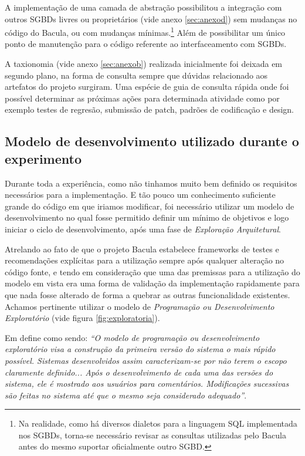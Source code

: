 A implementação de uma camada de abstração possibilitou a integração com outros SGBDs livres ou proprietários (vide anexo \ref{sec:anexod}) sem mudanças no código do Bacula, ou com mudanças mínimas.\footnote{Na realidade, como há diversos dialetos para a linguagem SQL implementada nos SGBDs, torna-se necessário revisar as consultas utilizadas pelo Bacula antes do mesmo suportar oficialmente outro SGBD.} Além de possibilitar um único ponto de manutenção para o código referente ao interfaceamento com SGBDs.

A taxionomia (vide anexo \ref{sec:anexob}) realizada inicialmente foi deixada em segundo plano, na forma de consulta sempre que dúvidas relacionado aos artefatos do projeto surgiram. Uma espécie de guia de consulta rápida onde foi possível determinar as próximas ações para determinada atividade como por exemplo testes de regresão, submissão de patch, padrões de codificação e design.

\subsection{Modelo de desenvolvimento utilizado durante o experimento} 

Durante toda a experiência, como não tinhamos muito bem definido os requisitos necessários para a implementação. E tão pouco um conhecimento suficiente grande do código em que iriamos modificar, foi necessário utilizar um modelo de desenvolvimento no qual fosse permitido definir um mínimo de objetivos e logo iniciar o ciclo de desenvolvimento, após uma fase de \textit{Exploração Arquitetural}. 

Atrelando ao fato de que o projeto Bacula estabelece frameworks de testes e recomendações explícitas para a utilização sempre após qualquer alteração no código fonte, e tendo em consideração que uma das premissas para a utilização do modelo em vista era uma forma de validação da implementação rapidamente para que nada fosse alterado de forma a quebrar as outras funcionalidade existentes. Achamos pertinente utilizar o modelo de \textit{Programação ou Desenvolvimento Exploratório} (vide figura \ref{fig:exploratoria}). 

Em \cite[página 31]{engenharia1} define como sendo: \textit{``O modelo de programação ou desenvolvimento exploratório visa a construção da primeira versão do sistema o mais rápido possível. Sistemas desenvolvidos assim caracterizam-se por não terem o escopo claramente definido... Após o desenvolvimento de cada uma das versões do sistema, ele é mostrado aos usuários para comentários. Modificações sucessivas são feitas no sistema até que o mesmo seja considerado adequado''}.


